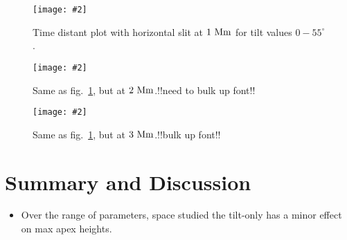 \documentclass[12pt]{ociamthesis}
\newcommand{\mfig}[4]{
  \begin{figure}
  \begin{center}
  \texttt{[image: \#2]}
  \caption{#3}
  \label{#4}
  \end{center}
  \end{figure}}
\begin{document}
\mfig{1}{figures/test_td_plot_1Mm.png}{Time distant plot with horizontal slit at $1~\rm{Mm}$ for tilt values $0-55^{\circ}$.}{td_1Mm}

\mfig{1}{figures/test_td_plot_2Mm.png}{Same as fig.~\ref{td_1Mm}, but at $2~\rm{Mm}$.!!need to bulk up font!!}{td_2Mm}

\mfig{1}{figures/test_td_plot_3Mm.png}{Same as fig.~\ref{td_1Mm}, but at $3~\rm{Mm}$.!!bulk up font!!}{td_3Mm}

\section{Summary and Discussion}
\label{sec:sum}
\begin{itemize}
\item Over the range of parameters, space studied the tilt-only has a minor effect on max apex heights. 
\end{itemize}




  
\end{document}
